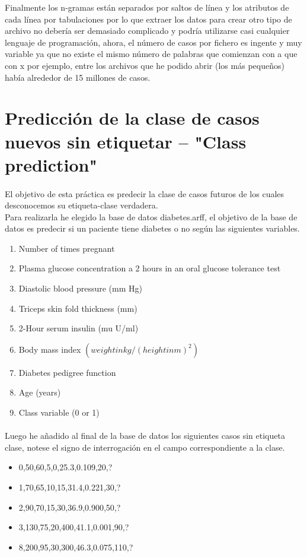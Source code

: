 \documentclass[es]{ifirak}
\begin{document}
Finalmente los n-gramas están separados por saltos de línea y los atributos de cada línea por tabulaciones por lo que extraer los datos para crear otro tipo de archivo no debería ser demasiado complicado y podría utilizarse casi cualquier lenguaje de programación, ahora, el número de casos por fichero es ingente y muy variable ya que no existe el mismo número de palabras que comienzan con a que con x por ejemplo, entre los archivos que he podido abrir (los más pequeños) había alrededor de 15 millones de casos.

\section{Predicción de la clase de casos nuevos sin etiquetar -- "Class prediction"}
\paragraph{}
El objetivo de esta práctica es predecir la clase de casos futuros de los cuales desconocemos su etiqueta-clase verdadera.\\

Para realizarla he elegido la base de datos diabetes.arff, el objetivo de la base de datos es predecir si un paciente tiene diabetes o no según las siguientes variables.
\begin{enumerate}
	\item Number of times pregnant
	\item Plasma glucose concentration a 2 hours in an oral glucose tolerance test
	\item Diastolic blood pressure (mm Hg)
	\item Triceps skin fold thickness (mm)
	\item 2-Hour serum insulin (mu U/ml)
	\item Body mass index $(weight in kg/(height in m)^2)$
	\item Diabetes pedigree function
	\item Age (years)
	\item Class variable (0 or 1)
\end{enumerate}
\paragraph{}
Luego he añadido al final de la base de datos los siguientes casos sin etiqueta clase, notese el signo de interrogación en el campo correspondiente a la clase.
	
\begin{itemize}
	\item 0,50,60,5,0,25.3,0.109,20,?
	\item	1,70,65,10,15,31.4,0.221,30,?
	\item	2,90,70,15,30,36.9,0.900,50,?
	\item	3,130,75,20,400,41.1,0.001,90,?
	\item	8,200,95,30,300,46.3,0.075,110,?
\end{itemize}
\end{document}
